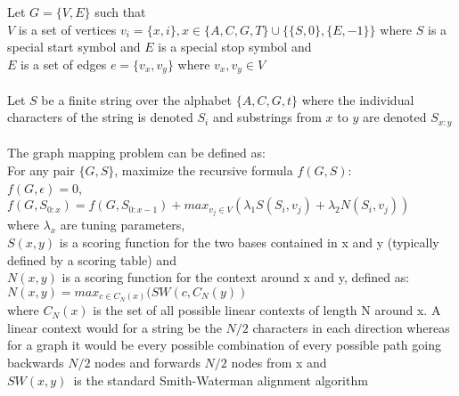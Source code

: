 \documentclass{article}
\begin{document}
\noindent
Let $G=\{V, E\}$ such that\\
$V$ is a set of vertices $v_i = \{x, i\}, x \in \{A, C, G, T\} \cup \{\{S, 0\}, \{E, -1\}\}$ where $S$ is a special start symbol and $E$ is a special stop symbol and\\
$E$ is a set of edges $e = \{v_x, v_y\}$ where $v_x, v_y \in V$\\
\\
Let $S$ be a finite string over the alphabet $\{A, C, G, t\}$ where the individual characters of the string is denoted $S_i$ and substrings from $x$ to $y$ are denoted $S_{x:y}$\\
\\
The graph mapping problem can be defined as:\\ For any pair $\{G, S\}$, maximize the recursive formula $f(G, S)$:\\
\indent$f(G, \epsilon) = 0$,\\
\indent$f(G, S_{0:x}) = f(G, S_{0:x-1}) + max_{v_j \in V}(\lambda_1 S(S_i, v_j) + \lambda_2 N(S_i, v_j))$\\
where $\lambda_x$ are tuning parameters,\\
$S(x, y)$ is a scoring function for the two bases contained in x and y (typically defined by a scoring table) and\\
$N(x, y)$ is a scoring function for the context around x and y, defined as:\\
$N(x, y) = max_{c \in C_N(x)}(SW(c, C_N(y))$\\
where $C_N(x)$ is the set of all possible linear contexts of length N around x. A linear context would for a string be the $N/2$ characters in each direction whereas for a graph it would be every possible combination of every possible path going backwards $N/2$ nodes and forwards $N/2$ nodes from x and\\
$SW(x, y)$ is the standard Smith-Waterman alignment algorithm
\end{document}
